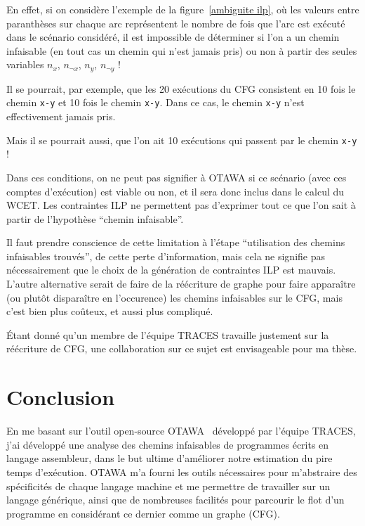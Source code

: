 \documentclass[french]{article}
\begin{document}
  En effet, si on considère l'exemple de la figure~\ref{ambiguite ilp}, où les valeurs entre paranthèses sur chaque arc représentent le nombre de fois que l'arc est exécuté dans le scénario considéré, il est impossible de déterminer si l'on a un chemin infaisable (en tout cas un chemin qui n'est jamais pris) ou non à partir des seules variables $n_x$, $n_{\neg x}$, $n_y$, $n_{\neg y}$ !

  Il se pourrait, par exemple, que les 20 exécutions du CFG consistent en 10 fois le chemin \texttt{x-\textlnot y} et 10 fois le chemin \texttt{\textlnot x-y}. Dans ce cas, le chemin \texttt{x-y} n'est effectivement jamais pris.

  Mais il se pourrait aussi, que l'on ait 10 exécutions qui passent par le chemin \texttt{x-y} !

  Dans ces conditions, on ne peut pas signifier à OTAWA si ce scénario (avec ces comptes d'exécution) est viable ou non, et il sera donc inclus dans le calcul du WCET. Les contraintes ILP ne permettent pas d'exprimer tout ce que l'on sait à partir de l'hypothèse ``chemin infaisable''.

  Il faut prendre conscience de cette limitation à l'étape ``utilisation des chemins infaisables trouvés'', de cette perte d'information, mais cela ne signifie pas nécessairement que le choix de la génération de contraintes ILP est mauvais. L'autre alternative serait de faire de la réécriture de graphe pour faire apparaître (ou plutôt disparaître en l'occurence) les chemins infaisables sur le CFG, mais c'est bien plus coûteux, et aussi plus compliqué.

  \'Etant donné qu'un membre de l'équipe TRACES travaille justement sur la réécriture de CFG, une collaboration sur ce sujet est envisageable pour ma thèse.

  \newpage{}
  \section*{Conclusion}
  En me basant sur l'outil open-source OTAWA~\cite{otawa} développé par l'équipe TRACES, j'ai développé une analyse des chemins infaisables de programmes écrits en langage assembleur, dans le but ultime d'améliorer notre estimation du pire temps d'exécution. OTAWA m'a fourni les outils nécessaires pour m'abstraire des spécificités de chaque langage machine et me permettre de travailler sur un langage générique, ainsi que de nombreuses facilités pour parcourir le flot d'un programme en considérant ce dernier comme un graphe (CFG).
\end{document}
